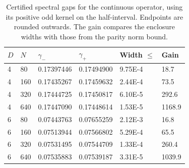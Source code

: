 \begin{table}[htbp]
\centering
\caption{Certified spectral gaps for the continuous operator, using its positive odd kernel on the half-interval. Endpoints are rounded outwards. The gain compares the enclosure widths with those from the parity norm bound.}
\label{tab:sharp_gaps}
\begin{tabular}{llllll}
\toprule
$D$ & $N$ & $\gamma_-$ & $\gamma_+$ & Width $\leq$ & Gain \\
\midrule
4 & 80 & 0.17397446 & 0.17494900 & 9.75E-4 & 18.7 \\
4 & 160 & 0.17435267 & 0.17459632 & 2.44E-4 & 73.5 \\
4 & 320 & 0.17444725 & 0.17450817 & 6.10E-5 & 292.6 \\
4 & 640 & 0.17447090 & 0.17448614 & 1.53E-5 & 1168.9 \\
6 & 80 & 0.07443763 & 0.07655259 & 2.12E-3 & 16.8 \\
6 & 160 & 0.07513944 & 0.07566802 & 5.29E-4 & 65.5 \\
6 & 320 & 0.07531495 & 0.07544709 & 1.33E-4 & 260.4 \\
6 & 640 & 0.07535883 & 0.07539187 & 3.31E-5 & 1039.9 \\
\bottomrule
\end{tabular}
\end{table}

